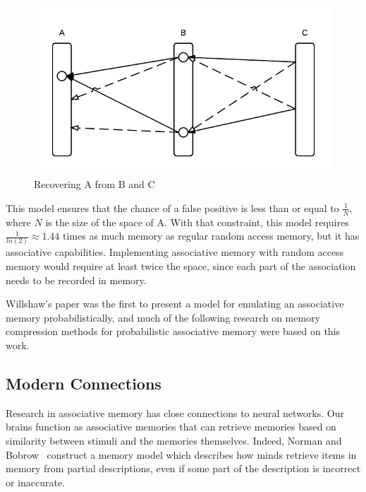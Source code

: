 \documentclass{sig-alternate}
\begin{document}
\begin{figure}[H]
	\begin{center}
		\includegraphics[width=1\linewidth]{mapping1}
	\end{center}
	\vspace{-12pt}
	\caption{Recovering A from B and C}
	\label{fig:mapping}
\end{figure}

This model ensures that the chance of a false positive is less than or equal to $\frac{1}{N}$, where $N$
is the size of the space of A. With that constraint, this model requires $\frac{1}{ln(2)} \approx 1.44$
times as much memory as regular random access memory, but it has associative capabilities. 
Implementing associative memory with random access memory would require at least twice the space,
since each part of the association needs to be recorded in memory.

Willshaw's paper was the first to present a model for emulating an associative memory
probabilistically, and much of the following research on memory compression methods
for probabilistic associative memory were based on this work.

\subsection{Modern Connections}
\label{subsec:modern}

Research in associative memory has close connections to neural networks. Our brains function as 
associative memories that can retrieve memories based on similarity between stimuli and the memories themselves. 
Indeed, Norman and Bobrow~\cite{bobrow} construct a memory model which describes how minds retrieve 
items in memory from partial descriptions, even if some part of the description is incorrect or inaccurate. 
\end{document}

